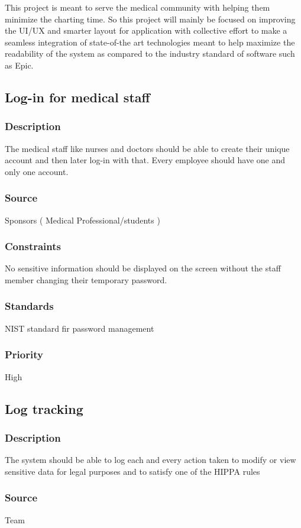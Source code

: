 This project is meant to serve the medical community with helping them minimize the charting time. So this project will mainly be focused on improving the UI/UX and smarter layout for application with collective effort to make a seamless integration of state-of-the art technologies meant to help maximize the readability of the system as compared to the industry standard of software such as Epic. 

\subsection{Log-in for medical staff}
\subsubsection{Description}
The medical staff like nurses and doctors should be able to create their unique account and then later log-in with that. Every employee should have one and only one account.
\subsubsection{Source}
Sponsors ( Medical Professional/students )
\subsubsection{Constraints}
No sensitive information should be displayed on the screen without the staff member changing their temporary password.
\subsubsection{Standards}
NIST standard fir password management
\subsubsection{Priority}
High

\subsection{Log tracking}
\subsubsection{Description}
The system should be able to log each and every action taken to modify or view sensitive data for legal purposes and to satisfy one of the HIPPA rules
\subsubsection{Source}
Team
